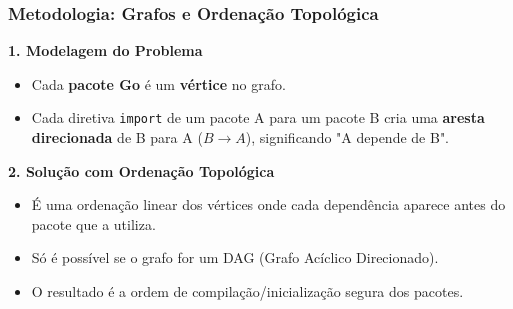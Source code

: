 \documentclass{beamer}
\begin{document}
\begin{frame}
  \frametitle{Metodologia: Grafos e Ordenação Topológica}

  \textbf{1. Modelagem do Problema}
  \begin{itemize}
    \item Cada \textbf{pacote Go} é um \textbf{vértice} no grafo.
    \item Cada diretiva \texttt{import} de um pacote A para um pacote B cria uma \textbf{aresta direcionada} de B para A ($B \rightarrow A$), significando "A depende de B".
  \end{itemize}
  \vspace{1cm}

  \textbf{2. Solução com Ordenação Topológica}
  \begin{itemize}
    \item É uma ordenação linear dos vértices onde cada dependência aparece antes do pacote que a utiliza.
    \item \alert{Só é possível se o grafo for um DAG} (Grafo Acíclico Direcionado).
    \item O resultado é a ordem de compilação/inicialização segura dos pacotes.
  \end{itemize}

\end{frame}
\end{document}
